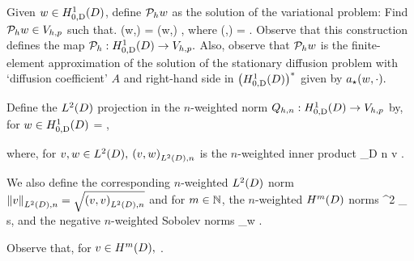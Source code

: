 Given $w \in \HozDD$, define $\mathcal P_{h} w$ as the solution of the variational problem: Find $\mathcal P_{h} w \in V_{h,p}$ such that.
\beq\label{eq:epdef}
\aep(\Ph w,\vh) = \aep(w,\vh) \tforall \vh \in \Vhp,
  \eeq
  where
  \beq\label{eq:aepdef}
  \aep(\vo,\vt) = \IPLtD{\grad \vo}{\grad \vt}.
  \eeq
  Observe that this construction defines the map $\Ph:\HozDD \rightarrow \Vhp.$ Also, observe that $\mathcal P_{h} w$ is the finite-element approximation of the solution of the stationary diffusion problem with `diffusion coefficient' $A$ and right-hand side in $\HozDDs$ given by $a_{\star}(w,\cdot).$
  
Define the $\LtD$ projection in the $n$-weighted norm $\Qhn:\HozDD\rightarrow \Vhp$ by, for $w \in \HozDD$
\beqs
{} =  \tforall \vh \in \Vhp,
\eeqs

where, for $v,w \in \LtD,$ $\IPLtDn{v}{w}$ is the $n$-weighted inner product
\beqs
{} \de \int_{D} n v \wbar.
\eeqs

We also define the corresponding $n$-weighted $\LtD$ norm $\NLtDn{v} = \sqrt{\IPLtDn{v}{v}}$ and for $m \in \mathbb N$, the $n$-weighted $\HmD$ norms
\beqs
{}^2 \de \sum_{\alpha \st \abs{\alpha} \leq s},
\eeqs
and the negative $n$-weighted Sobolev norms
\beq\label{eq:negweightnorm}
 \de \sup_{w \in \HmD} .
\eeq

Observe that, for $v \in \HmD,$
\beq\label{eq:nconv}
\nmin{} \leq {} \leq \nmax {}.
\eeq

